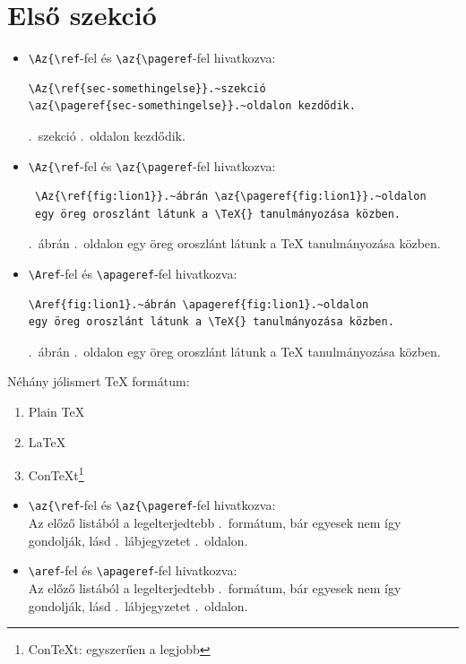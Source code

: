 \documentclass{article}
\begin{document}
\section{Első szekció}\label{sec-something}
\begin{itemize}
\item 
\verb!\Az{\ref!-fel és  \verb!\az{\pageref!-fel hivatkozva:
\begin{verbatim}
\Az{\ref{sec-somethingelse}}.~szekció 
\az{\pageref{sec-somethingelse}}.~oldalon kezdődik.
\end{verbatim}	
\Az{\ref{sec-somethingelse}}.~szekció \az{\pageref{sec-somethingelse}}.~oldalon kezdődik.
\item 
\verb!\Az{\ref!-fel és  \verb!\az{\pageref!-fel hivatkozva:
\begin{verbatim}
 \Az{\ref{fig:lion1}}.~ábrán \az{\pageref{fig:lion1}}.~oldalon 
 egy öreg oroszlánt látunk a \TeX{} tanulmányozása közben.	
\end{verbatim}			
 \Az{\ref{fig:lion1}}.~ábrán \az{\pageref{fig:lion1}}.~oldalon egy öreg oroszlánt látunk a \TeX{} tanulmányozása közben.
\item 
\verb!\Aref!-fel és \verb!\apageref!-fel hivatkozva:
\begin{verbatim}
\Aref{fig:lion1}.~ábrán \apageref{fig:lion1}.~oldalon 
egy öreg oroszlánt látunk a \TeX{} tanulmányozása közben.	
\end{verbatim}	
 .~ábrán .~oldalon egy öreg oroszlánt látunk a \TeX{} tanulmányozása közben.
\end{itemize}
Néhány jólismert \TeX{} formátum:
\begin{enumerate}
\item Plain \TeX
\item \label{popular} \LaTeX
\item Con\TeX t\footnote{Con\TeX t: egyszerűen a legjobb\label{fn-best}}
\end{enumerate}
%
\begin{itemize}
\item
\verb!\az{\ref!-fel és  \verb!\az{\pageref!-fel hivatkozva:\\ Az előző listából a legelterjedtebb \az{\ref{popular}}.~formátum, bár egyesek nem így gondolják, lásd \az{\ref{fn-best}}.~lábjegyzetet \az{\pageref{fn-best}}.~oldalon.
\item
\verb!\aref!-fel és \verb!\apageref!-fel hivatkozva:\\ Az előző listából a legelterjedtebb .~formátum, bár egyesek nem így gondolják, lásd .~lábjegyzetet .~oldalon.
\end{itemize}
\end{document}
